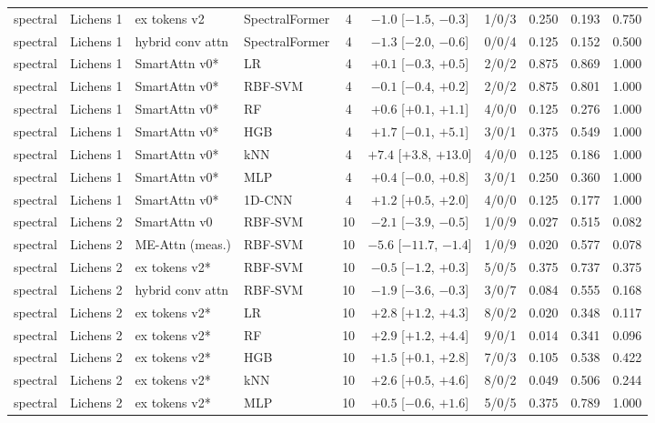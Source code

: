 \begin{tabular}{llllcclccc}
spectral & Lichens 1 & ex tokens v2 & SpectralFormer & 4 & $-1.0$ [$-1.5$, $-0.3$] & 1/0/3 & 0.250 & 0.193 & 0.750 \\
spectral & Lichens 1 & hybrid conv attn & SpectralFormer & 4 & $-1.3$ [$-2.0$, $-0.6$] & 0/0/4 & 0.125 & 0.152 & 0.500 \\
spectral & Lichens 1 & SmartAttn v0* & LR & 4 & $+0.1$ [$-0.3$, $+0.5$] & 2/0/2 & 0.875 & 0.869 & 1.000 \\
spectral & Lichens 1 & SmartAttn v0* & RBF-SVM & 4 & $-0.1$ [$-0.4$, $+0.2$] & 2/0/2 & 0.875 & 0.801 & 1.000 \\
spectral & Lichens 1 & SmartAttn v0* & RF & 4 & $+0.6$ [$+0.1$, $+1.1$] & 4/0/0 & 0.125 & 0.276 & 1.000 \\
spectral & Lichens 1 & SmartAttn v0* & HGB & 4 & $+1.7$ [$-0.1$, $+5.1$] & 3/0/1 & 0.375 & 0.549 & 1.000 \\
spectral & Lichens 1 & SmartAttn v0* & kNN & 4 & $+7.4$ [$+3.8$, $+13.0$] & 4/0/0 & 0.125 & 0.186 & 1.000 \\
spectral & Lichens 1 & SmartAttn v0* & MLP & 4 & $+0.4$ [$-0.0$, $+0.8$] & 3/0/1 & 0.250 & 0.360 & 1.000 \\
spectral & Lichens 1 & SmartAttn v0* & 1D-CNN & 4 & $+1.2$ [$+0.5$, $+2.0$] & 4/0/0 & 0.125 & 0.177 & 1.000 \\
\midrule
spectral & Lichens 2 & SmartAttn v0 & RBF-SVM & 10 & $-2.1$ [$-3.9$, $-0.5$] & 1/0/9 & 0.027 & 0.515 & 0.082 \\
spectral & Lichens 2 & ME-Attn (meas.) & RBF-SVM & 10 & $-5.6$ [$-11.7$, $-1.4$] & 1/0/9 & 0.020 & 0.577 & 0.078 \\
spectral & Lichens 2 & ex tokens v2* & RBF-SVM & 10 & $-0.5$ [$-1.2$, $+0.3$] & 5/0/5 & 0.375 & 0.737 & 0.375 \\
spectral & Lichens 2 & hybrid conv attn & RBF-SVM & 10 & $-1.9$ [$-3.6$, $-0.3$] & 3/0/7 & 0.084 & 0.555 & 0.168 \\
spectral & Lichens 2 & ex tokens v2* & LR & 10 & $+2.8$ [$+1.2$, $+4.3$] & 8/0/2 & 0.020 & 0.348 & 0.117 \\
spectral & Lichens 2 & ex tokens v2* & RF & 10 & $+2.9$ [$+1.2$, $+4.4$] & 9/0/1 & 0.014 & 0.341 & 0.096 \\
spectral & Lichens 2 & ex tokens v2* & HGB & 10 & $+1.5$ [$+0.1$, $+2.8$] & 7/0/3 & 0.105 & 0.538 & 0.422 \\
spectral & Lichens 2 & ex tokens v2* & kNN & 10 & $+2.6$ [$+0.5$, $+4.6$] & 8/0/2 & 0.049 & 0.506 & 0.244 \\
spectral & Lichens 2 & ex tokens v2* & MLP & 10 & $+0.5$ [$-0.6$, $+1.6$] & 5/0/5 & 0.375 & 0.789 & 1.000 \\

\end{tabular}
